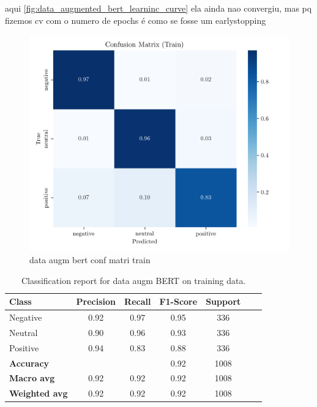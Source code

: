 \documentclass[conference]{IEEEtran}
\begin{document}
aqui \ref{fig:data_augmented_bert_learninc_curve} ela ainda nao convergiu, mas pq fizemos cv com o numero de epochs é como se fosse um earlystopping

\begin{figure}[H]
    \centering
    \includegraphics[width=1\linewidth]{assets/dataaugmented_bert_confusion_matrix_Train.png}
    \caption{data augm bert conf matri train}
    \label{fig:dataaugmented_bert_confusion_matrix_Train}
\end{figure}

\begin{table}[H]
\centering
\caption{Classification report for data augm BERT on training data.}
\label{cr_augmbert_train}
\begin{tabular}{lcccccc}
\toprule
\textbf{Class} & \textbf{Precision} & \textbf{Recall} & \textbf{F1-Score} & \textbf{Support} \\
\midrule
Negative & 0.92 & 0.97 & 0.95 & 336 \\
Neutral & 0.90 & 0.96 & 0.93 & 336 \\
Positive & 0.94 & 0.83 & 0.88 & 336 \\
\midrule
\textbf{Accuracy} &  &  & 0.92 & 1008 \\
\textbf{Macro avg} & 0.92 & 0.92 & 0.92 & 1008 \\
\textbf{Weighted avg} & 0.92 & 0.92 & 0.92 & 1008 \\
\bottomrule
\end{tabular}
\end{table}
\end{document}
